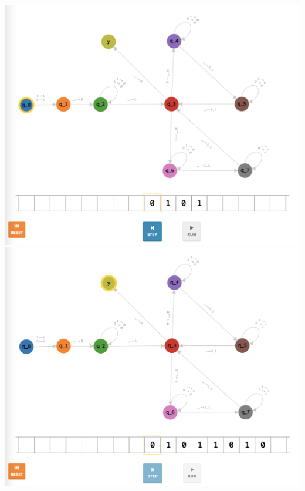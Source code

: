 \documentclass[a4paper]{article}
\begin{document}
\begin{center}
\includegraphics[width=\textwidth]{TM2.7}
\includegraphics[width=\textwidth]{TM2.8}
\end{center}
\newpage
\end{document}
